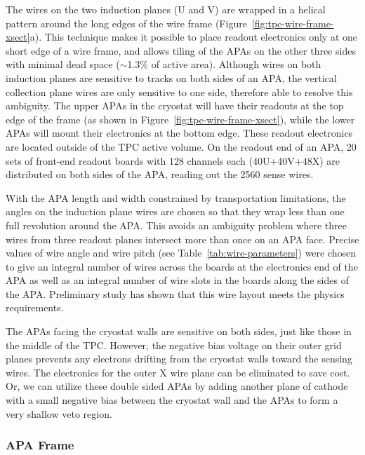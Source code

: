 The wires on the two induction planes (U and V) are wrapped in a
helical pattern around the long edges of the wire frame
(Figure~\ref{fig:tpc-wire-frame-xsect}a). This technique makes it
possible to place readout electronics only at one short edge of a wire
frame, and allows tiling of the APAs on the other three sides with
minimal dead space ($\sim$1.3\% of active area).  Although wires on
both induction planes are sensitive to tracks on both sides of an APA,
the vertical collection plane wires are only sensitive to one side,
therefore able to resolve this ambiguity.  The upper APAs in the
cryostat will have their readouts at the top edge of the frame (as
shown in Figure~\ref{fig:tpc-wire-frame-xsect}), while the lower APAs
will mount their electronics at the bottom edge.  These readout
electronics are located outside of the TPC active volume.  On the
readout end of an APA, 20 sets of front-end readout boards with 128
channels each (40U+40V+48X) are distributed on both sides of the APA,
reading out the 2560 sense wires.

With the APA length and width constrained by transportation
limitations, the angles on the induction plane wires are chosen so
that they wrap less than one full revolution around the APA.  This
avoids an ambiguity problem where three wires from three readout
planes intersect more than once on an APA face.  Precise values of
wire angle and wire pitch (see Table~\ref{tab:wire-parameters}) were
chosen to give an integral number of wires across the boards at the
electronics end of the APA as well as an integral number of wire slots
in the boards along the sides of the APA.  Preliminary
study\cite{wire-orientation} has shown that this wire layout meets the
physics requirements.

The APAs facing the cryostat walls are sensitive on both sides, just
like those in the middle of the TPC.  However, the negative bias
voltage on their outer grid planes prevents any electrons drifting
from the cryostat walls toward the sensing wires.  The electronics for
the outer X wire plane can be eliminated to save cost.  Or, we can
utilize these double sided APAs by adding another plane of cathode
with a small negative bias between the cryostat wall and the APAs to
form a very shallow veto region.




\subsubsection{APA Frame}
\label{subsec:fd-ref-apaframes}

